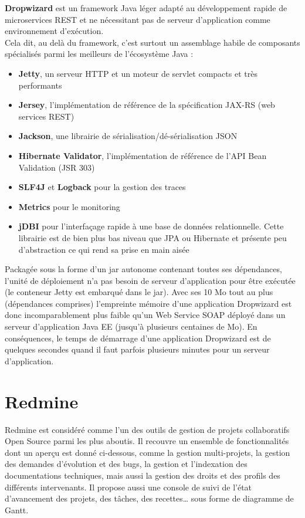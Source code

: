 \textbf{Dropwizard} est un framework Java léger adapté au développement rapide de microservices REST et ne nécessitant pas de serveur d’application comme environnement d’exécution. \\
Cela dit, au delà du framework, c’est surtout un assemblage habile de composants spécialisés parmi les meilleurs de l’écosystème Java :
\begin{itemize}
\item \textbf{Jetty}, un serveur HTTP et un moteur de servlet compacts et très performants 
\item \textbf{Jersey}, l’implémentation de référence de la spécification JAX-RS (web services REST) 
\item \textbf{Jackson}, une librairie de sérialisation/dé-sérialisation JSON 
\item \textbf{Hibernate Validator}, l’implémentation de référence de l’API Bean Validation (JSR 303) 
\item \textbf{SLF4J} et \textbf{Logback} pour la gestion des traces 
\item \textbf{Metrics} pour le monitoring 
\item \textbf{jDBI} pour l’interfaçage rapide à une base de données relationnelle. Cette librairie est de bien plus bas niveau que JPA ou Hibernate et présente peu d’abstraction ce qui rend sa prise en main aisée \\
\end{itemize}

Packagée sous la forme d’un jar autonome contenant toutes ses dépendances, l’unité de déploiement n’a pas besoin de serveur d’application pour être exécutée (le conteneur Jetty est embarqué dans le jar). Avec ses 10 Mo tout au plus (dépendances comprises) l’empreinte mémoire d’une application Dropwizard est donc incomparablement plus faible qu’un Web Service SOAP déployé dans un serveur d’application Java EE (jusqu’à plusieurs centaines de Mo).
En conséquences, le temps de démarrage d’une application Dropwizard est de quelques secondes quand il faut parfois plusieurs minutes pour un serveur d’application.\\

\pagebreak


\section{Redmine}\label{Annexe C}

Redmine est considéré comme l’un des outils de gestion de projets collaboratifs Open Source parmi les plus aboutis. Il recouvre un ensemble de fonctionnalités dont un aperçu est donné ci-dessous, comme la gestion multi-projets, la gestion des demandes d’évolution et des bugs, la gestion et l’indexation des documentations techniques, mais aussi la gestion des droits et des profils des différents intervenants. Il propose aussi une console de suivi de l’état d’avancement des projets, des tâches, des recettes… sous forme de diagramme de Gantt.\\

